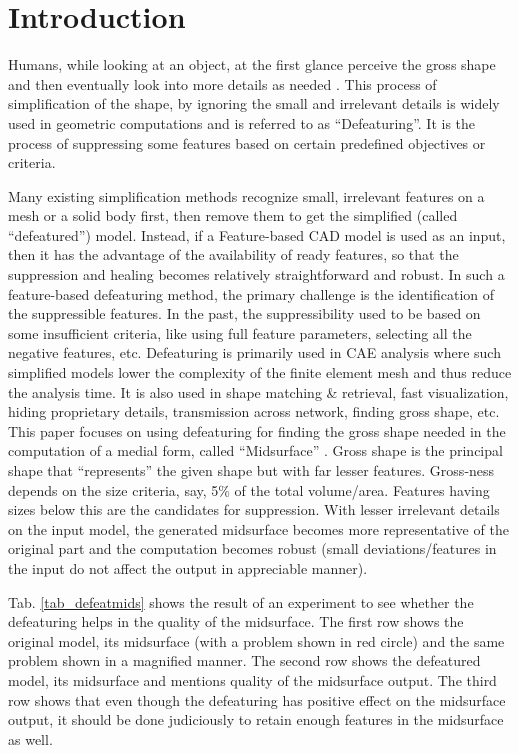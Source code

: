 \section{Introduction}

	Humans, while looking at an object, at the first glance perceive the gross shape and then eventually look into more details as needed \cite{LeeLee1998}. This process of simplification of the shape, by ignoring the small and irrelevant details is widely used in geometric computations and is referred to as ``Defeaturing''.  It is the process of suppressing some features based on certain predefined objectives or criteria.
	
		Many existing simplification methods recognize small, irrelevant features on a mesh or a solid body first, then remove them to get the simplified (called ``defeatured'') model. Instead, if a Feature-based CAD model is used as an input, then it has the advantage of the availability of ready features, so that the suppression and healing becomes relatively straightforward and robust. In such a feature-based defeaturing method, the primary challenge is the identification of the suppressible features. In the past, the suppressibility used to be based on some insufficient criteria, like using full feature parameters, selecting all the negative features, etc. 
Defeaturing is primarily used in CAE analysis where such simplified models lower the complexity of the finite element mesh and thus reduce the analysis time. It is also used in shape matching \& retrieval, fast visualization, hiding proprietary details, transmission across network, finding gross shape, etc. This paper focuses on using defeaturing for finding the gross shape needed in the computation of a medial form, called ``Midsurface'' \cite{Ramanathan2004}. Gross shape is the principal shape that “represents” the given shape but with far lesser features. Gross-ness depends on the size criteria, say, 5\% of the total volume/area. Features having sizes below this are the candidates for suppression. With lesser irrelevant details on the input model, the generated midsurface becomes more representative of the original part and the computation becomes robust (small deviations/features in the input do not affect the output in appreciable manner).

Tab. \ref{tab_defeatmids}  shows the result of an experiment to see whether the defeaturing helps in the quality of the midsurface. The first row shows the original model, its midsurface (with a problem shown in red circle) and the same problem shown in a magnified manner. The second row shows the defeatured model, its midsurface and mentions quality of the midsurface output.  The third row shows that even though the defeaturing has positive effect on the midsurface output, it should be done judiciously to retain enough features in the midsurface as well.

